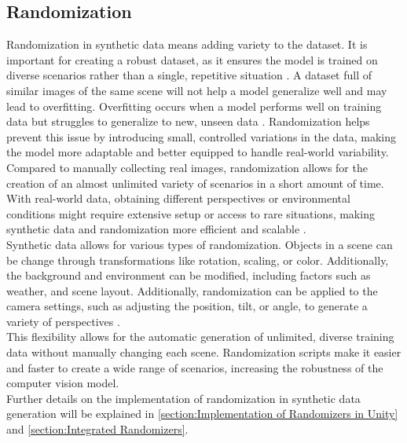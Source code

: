 \subsection{Randomization}
Randomization in synthetic data means adding variety to the dataset. It is important for creating a robust dataset, as it ensures the model is trained on diverse scenarios rather than a single, repetitive situation \cite{borkman2021unityperceptiongeneratesynthetic}. A dataset full of similar images of the same scene will not help a model generalize well and may lead to overfitting. Overfitting occurs when a model performs well on training data but struggles to generalize to new, unseen data \cite{Ying_2019}. Randomization helps prevent this issue by introducing small, controlled variations in the data, making the model more adaptable and better equipped to handle real-world variability.\\

\noindent Compared to manually collecting real images, randomization allows for the creation of an almost unlimited variety of scenarios in a short amount of time. With real-world data, obtaining different perspectives or environmental conditions might require extensive setup or access to rare situations, making synthetic data and randomization more efficient and scalable \cite{borkman2021unityperceptiongeneratesynthetic}. \\

\noindent Synthetic data allows for various types of randomization. Objects in a scene can be change through transformations like rotation, scaling, or color. Additionally, the background and environment can be modified, including factors such as weather, and scene layout. Additionally, randomization can be applied to the camera settings, such as adjusting the position, tilt, or angle, to generate a variety of perspectives \cite{borkman2021unityperceptiongeneratesynthetic}.\\

\noindent This flexibility allows for the automatic generation of unlimited, diverse training data without manually changing each scene. Randomization scripts make it easier and faster to create a wide range of scenarios, increasing the robustness of the computer vision model.\\

\noindent Further details on the implementation of randomization in synthetic data generation will be explained in \ref{section:Implementation of Randomizers in Unity} and \ref{section:Integrated Randomizers}.


